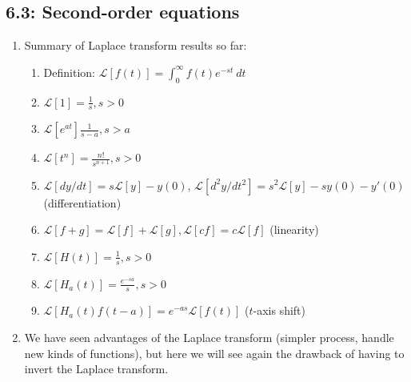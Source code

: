\documentclass{article}
\newcommand{\ds}{\displaystyle}
\begin{document}
\subsection{6.3: Second-order equations}

\begin{enumerate}

\item Summary of Laplace transform results so far:
\begin{enumerate}
\item Definition: $\ds \mathcal{L}[f(t)] = \int_0^{\infty} f(t) e^{-st}~dt$
\item $\ds \mathcal{L}[1] = \frac{1}{s}, s>0$
\item $\ds \mathcal{L}[e^{at}] \frac{1}{s-a}, s>a$
\item $\ds \mathcal{L}[t^n] = \frac{n!}{s^{n+1}}, s>0$
\item $\ds \mathcal{L}[dy/dt] = s\mathcal{L}[y] - y(0)$, $\ds \mathcal{L}[d^2y/dt^2] = s^2\mathcal{L}[y] - sy(0)-y'(0)$ (differentiation)
\item $\ds \mathcal{L}[f+g]=\mathcal{L}[f]+\mathcal{L}[g], \mathcal{L}[cf]=c\mathcal{L}[f]$ (linearity)
\item $\ds \mathcal{L}[H(t)]=\frac{1}{s}, s>0$
\item $\ds \mathcal{L}[H_a(t)] = \frac{e^{-sa}}{s}, s>0$
\item $\ds \mathcal{L}[H_a(t)f(t-a)] = e^{-as}\mathcal{L}[f(t)]$ ($t$-axis shift)
\end{enumerate}

\item We have seen advantages of the Laplace transform (simpler process, handle new kinds of functions), but here we will see again the drawback of having to invert the Laplace transform.


\end{enumerate}
\end{document}
